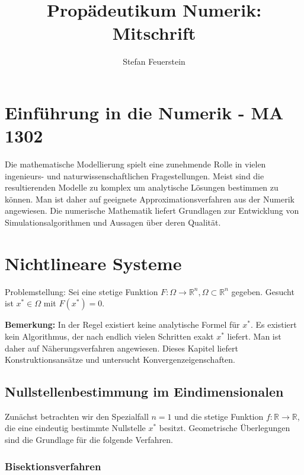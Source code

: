 \documentclass[10pt,a4paper]{article}
\author{Stefan Feuerstein}
\title {Propädeutikum Numerik: Mitschrift}
\theoremstyle{definition} \newtheorem{definition}{Definition}[section]
\theoremstyle{bemerkung}    \newtheorem{bemerkung}{Bemerkung}[]
\begin{document}
\maketitle
\section*{Einführung in die Numerik - MA 1302}

Die mathematische Modellierung spielt eine zunehmende Rolle in vielen
ingenieurs- und naturwissenschaftlichen Fragestellungen.  Meist sind die
resultierenden Modelle zu komplex um analytische Lösungen bestimmen zu können.
Man ist daher auf geeignete Approximationsverfahren aus der Numerik angewiesen.
Die numerische Mathematik liefert Grundlagen zur Entwicklung von
Simulationsalgorithmen und Aussagen über deren Qualität.


\section{Nichtlineare Systeme}

Problemstellung: Sei eine stetige Funktion
$F: \Omega \longrightarrow \mathbb{R}^n, \Omega \subset \mathbb{R}^n$ gegeben.
Gesucht ist $x^*\in \Omega$ mit $F(x^*)=0$.
\newline

\textbf{Bemerkung:} In der Regel existiert keine analytische Formel für $x^*$.
Es existiert kein Algorithmus, der nach endlich vielen Schritten exakt $x^*$
liefert.  Man ist daher auf Näherungsverfahren angewiesen.  Dieses Kapitel
liefert Konstruktionsansätze und untersucht Konvergenzeigenschaften.

\subsection{Nullstellenbestimmung im Eindimensionalen}

Zunächst betrachten wir den Spezialfall $n=1$ und die stetige Funktion $f:
\mathbb{R} \longrightarrow \mathbb{R}$, die eine eindeutig bestimmte Nullstelle
$x^*$ besitzt. Geometrische Überlegungen sind die Grundlage für die folgende
Verfahren.


\subsubsection{Bisektionsverfahren}
\end{document}
